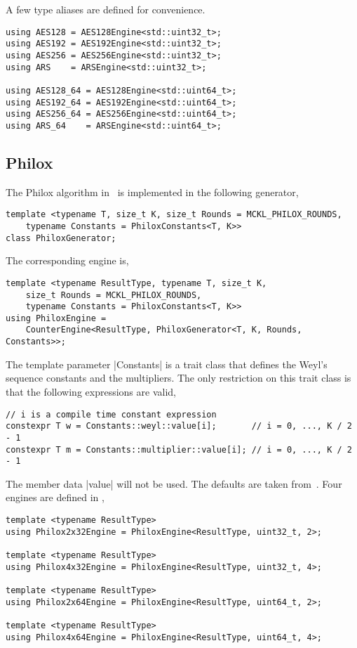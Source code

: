 A few type aliases are defined for convenience.
\begin{verbatim}
using AES128 = AES128Engine<std::uint32_t>;
using AES192 = AES192Engine<std::uint32_t>;
using AES256 = AES256Engine<std::uint32_t>;
using ARS    = ARSEngine<std::uint32_t>;

using AES128_64 = AES128Engine<std::uint64_t>;
using AES192_64 = AES192Engine<std::uint64_t>;
using AES256_64 = AES256Engine<std::uint64_t>;
using ARS_64    = ARSEngine<std::uint64_t>;
\end{verbatim}

\subsection{Philox}
\label{sub:Philox}

The Philox algorithm in~\cite{Salmon:2011um} is implemented in the following
generator,
\begin{verbatim}
template <typename T, size_t K, size_t Rounds = MCKL_PHILOX_ROUNDS,
    typename Constants = PhiloxConstants<T, K>>
class PhiloxGenerator;
\end{verbatim}
The corresponding \rng engine is,
\begin{verbatim}
template <typename ResultType, typename T, size_t K,
    size_t Rounds = MCKL_PHILOX_ROUNDS,
    typename Constants = PhiloxConstants<T, K>>
using PhiloxEngine =
    CounterEngine<ResultType, PhiloxGenerator<T, K, Rounds, Constants>>;
\end{verbatim}
The template parameter |Constants| is a trait class that defines the Weyl's
sequence constants and the multipliers. The only restriction on this trait
class is that the following expressions are valid,
\begin{verbatim}
// i is a compile time constant expression
constexpr T w = Constants::weyl::value[i];       // i = 0, ..., K / 2 - 1
constexpr T m = Constants::multiplier::value[i]; // i = 0, ..., K / 2 - 1
\end{verbatim}
The member data |value| will not be \odr used. The defaults are taken
from~\cite{Salmon:2011um}. Four engines are defined in \mckl,
\begin{verbatim}
template <typename ResultType>
using Philox2x32Engine = PhiloxEngine<ResultType, uint32_t, 2>;

template <typename ResultType>
using Philox4x32Engine = PhiloxEngine<ResultType, uint32_t, 4>;

template <typename ResultType>
using Philox2x64Engine = PhiloxEngine<ResultType, uint64_t, 2>;

template <typename ResultType>
using Philox4x64Engine = PhiloxEngine<ResultType, uint64_t, 4>;
\end{verbatim}
